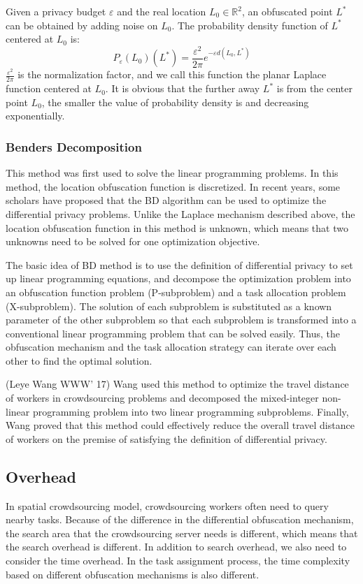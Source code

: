 Given a privacy budget $\varepsilon$ and the real location $L_0 \in \mathbb R^2$, an obfuscated point $L^*$ can be obtained by adding noise on $L_0$. The probability density function of $L^*$ centered at $L_0$ is:
$$
	P_\varepsilon (L_0)(L^*)=\frac{\varepsilon^2}{2\pi} e^{-\varepsilon d(L_0,L^*)}
$$
$\frac{\varepsilon^2}{2\pi}$ is the normalization factor, and we call this function the planar Laplace function centered at $L_0$. It is obvious that the further away $L^*$ is from the center point $L_0$, the smaller the value of probability density is and decreasing exponentially.

\subsubsection{Benders Decomposition}
This method was first used to solve the linear programming problems. In this method, the location obfuscation function is discretized. In recent years, some scholars have proposed that the BD algorithm can be used to optimize the differential privacy problems. Unlike the Laplace mechanism described above, the location obfuscation function in this method is unknown, which means that two unknowns need to be solved for one optimization objective.

The basic idea of BD method is to use the definition of differential privacy to set up linear programming equations, and decompose the optimization problem into an obfuscation function problem (P-subproblem) and a task allocation problem (X-subproblem). The solution of each subproblem is substituted as a known parameter of the other subproblem so that each subproblem is transformed into a conventional linear programming problem that can be solved easily. Thus, the obfuscation mechanism and the task allocation strategy can iterate over each other to find the optimal solution.

(Leye Wang WWW' 17) Wang used this method to optimize the travel distance of workers in crowdsourcing problems and decomposed the mixed-integer non-linear programming problem into two linear programming subproblems. Finally, Wang proved that this method could effectively reduce the overall travel distance of workers on the premise of satisfying the definition of differential privacy.

\subsection{Overhead} %
In spatial crowdsourcing model, crowdsourcing workers often need to query nearby tasks. Because of the difference in the differential obfuscation mechanism, the search area that the crowdsourcing server needs is different, which means that the search overhead is different. In addition to search overhead, we also need to consider the time overhead. In the task assignment process, the time complexity based on different obfuscation mechanisms is also different.

